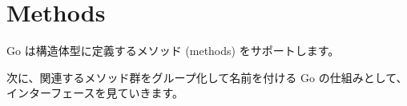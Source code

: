 \section{Methods}

Go は構造体型に定義するメソッド (methods) をサポートします。




次に、関連するメソッド群をグループ化して名前を付ける Go の仕組みとして、インターフェースを見ていきます。